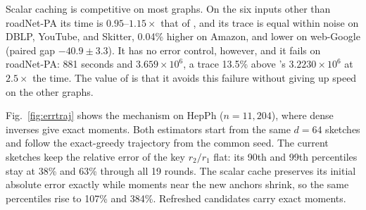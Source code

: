 Scalar caching is competitive on most graphs. On the six inputs other
than roadNet-PA its time is $0.95$--$1.15\times$ that of \alg{}, and
its trace is equal within noise on DBLP, YouTube, and Skitter, 0.04\%
higher on Amazon, and lower on web-Google (paired gap $-40.9\pm3.3$).
It has no error control, however, and it fails on roadNet-PA:
881 seconds and $3.659\times10^6$, a trace 13.5\% above \alg{}'s
$3.2230\times10^6$ at $2.5\times$ the time. The value of \alg{} is
that it avoids this failure without giving up speed on the other graphs.

Fig.~\ref{fig:errtraj} shows the mechanism on HepPh ($n=11{,}204$),
where dense inverses give exact moments. Both estimators start from
the same $d=64$ sketches and follow the exact-greedy trajectory from
the common seed. The current sketches keep the relative error of the
key $r_2/r_1$ flat: its 90th and 99th percentiles stay at 38\% and
63\% through all 19 rounds. The scalar cache preserves its initial
absolute error exactly while moments near the new anchors shrink, so
the same percentiles rise to 107\% and 384\%. Refreshed \alg{}
candidates carry exact moments.

